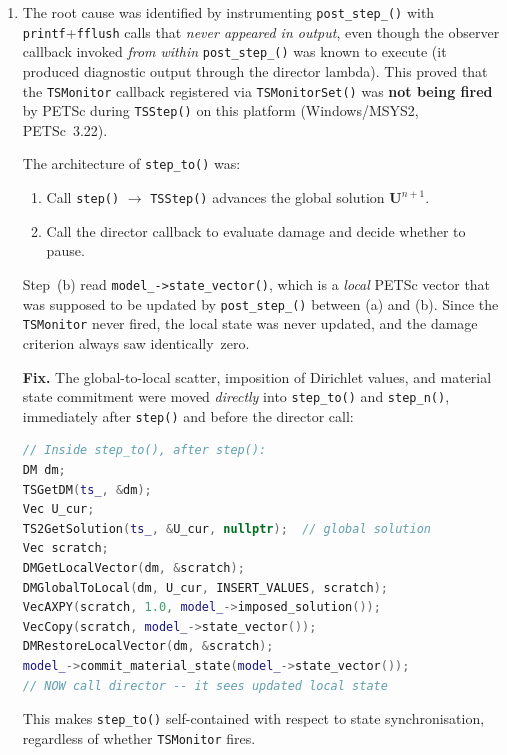 \begin{enumerate}
  \item The root cause was identified by instrumenting
    \texttt{post\_step\_()} with \texttt{printf}+\texttt{fflush} calls
    that \emph{never appeared in output}, even though the observer
    callback invoked \emph{from within} \texttt{post\_step\_()} was
    known to execute (it produced diagnostic output through the director
    lambda).  This proved that the \texttt{TSMonitor} callback
    registered via \texttt{TSMonitorSet()} was \textbf{not being fired}
    by PETSc during \texttt{TSStep()} on this platform
    (Windows/MSYS2, PETSc~3.22).

    The architecture of \texttt{step\_to()} was:
    \begin{enumerate}[label=(\alph*)]
      \item Call \texttt{step()} $\to$ \texttt{TSStep()} advances the
            global solution $\mathbf{U}^{n+1}$.
      \item Call the director callback to evaluate damage and decide
            whether to pause.
    \end{enumerate}
    Step~(b) read \texttt{model\_->state\_vector()}, which is a
    \emph{local} PETSc vector that was supposed to be updated by
    \texttt{post\_step\_()} between (a) and (b).  Since the
    \texttt{TSMonitor} never fired, the local state was never updated,
    and the damage criterion always saw identically~zero.

    \textbf{Fix.}  The global-to-local scatter, imposition of Dirichlet
    values, and material state commitment were moved \emph{directly}
    into \texttt{step\_to()} and \texttt{step\_n()}, immediately after
    \texttt{step()} and before the director call:
\begin{lstlisting}[language=C++,basicstyle=\ttfamily\scriptsize]
// Inside step_to(), after step():
DM dm;
TSGetDM(ts_, &dm);
Vec U_cur;
TS2GetSolution(ts_, &U_cur, nullptr);  // global solution
Vec scratch;
DMGetLocalVector(dm, &scratch);
DMGlobalToLocal(dm, U_cur, INSERT_VALUES, scratch);
VecAXPY(scratch, 1.0, model_->imposed_solution());
VecCopy(scratch, model_->state_vector());
DMRestoreLocalVector(dm, &scratch);
model_->commit_material_state(model_->state_vector());
// NOW call director -- it sees updated local state
\end{lstlisting}
    This makes \texttt{step\_to()} self-contained with respect to state
    synchronisation, regardless of whether \texttt{TSMonitor} fires.
\end{enumerate}

